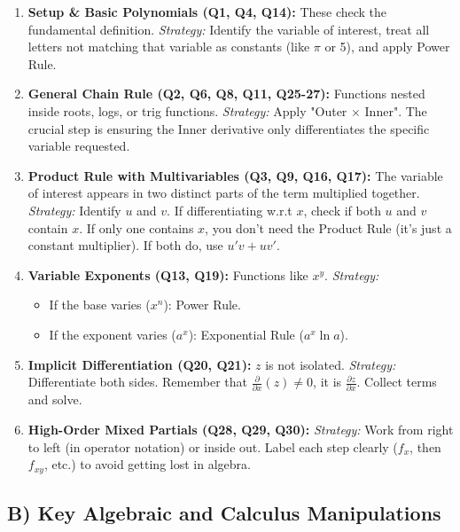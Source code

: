 \documentclass{article}
\begin{document}
\begin{enumerate}
    \item \textbf{Setup \& Basic Polynomials (Q1, Q4, Q14):}
    These check the fundamental definition.
    \textit{Strategy:} Identify the variable of interest, treat all letters not matching that variable as constants (like $\pi$ or 5), and apply Power Rule.

    \item \textbf{General Chain Rule (Q2, Q6, Q8, Q11, Q25-27):}
    Functions nested inside roots, logs, or trig functions.
    \textit{Strategy:} Apply "Outer $\times$ Inner". The crucial step is ensuring the Inner derivative only differentiates the specific variable requested.

    \item \textbf{Product Rule with Multivariables (Q3, Q9, Q16, Q17):}
    The variable of interest appears in two distinct parts of the term multiplied together.
    \textit{Strategy:} Identify $u$ and $v$. If differentiating w.r.t $x$, check if both $u$ and $v$ contain $x$. If only one contains $x$, you don't need the Product Rule (it's just a constant multiplier). If both do, use $u'v + uv'$.

    \item \textbf{Variable Exponents (Q13, Q19):}
    Functions like $x^y$.
    \textit{Strategy:}
    \begin{itemize}
        \item If the base varies ($x^n$): Power Rule.
        \item If the exponent varies ($a^x$): Exponential Rule ($a^x \ln a$).
    \end{itemize}

    \item \textbf{Implicit Differentiation (Q20, Q21):}
    $z$ is not isolated.
    \textit{Strategy:} Differentiate both sides. Remember that $\frac{\partial}{\partial x}(z) \neq 0$, it is $\frac{\partial z}{\partial x}$. Collect terms and solve.

    \item \textbf{High-Order Mixed Partials (Q28, Q29, Q30):}
    \textit{Strategy:} Work from right to left (in operator notation) or inside out. Label each step clearly ($f_x$, then $f_{xy}$, etc.) to avoid getting lost in algebra.
\end{enumerate}

\subsection{B) Key Algebraic and Calculus Manipulations}
\end{document}
